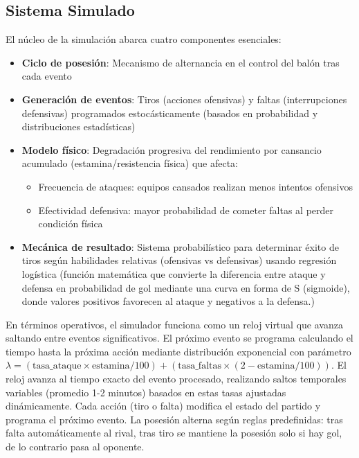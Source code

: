 \documentclass{article}
\begin{document}
\subsection{Sistema Simulado}
El núcleo de la simulación abarca cuatro componentes esenciales:

\begin{itemize}
    \item \textbf{Ciclo de posesión}: Mecanismo de alternancia en el control del balón tras cada evento
    \item \textbf{Generación de eventos}: Tiros (acciones ofensivas) y faltas (interrupciones defensivas) programados estocásticamente (basados en probabilidad y distribuciones estadísticas)
    \item \textbf{Modelo físico}: Degradación progresiva del rendimiento por cansancio acumulado (estamina/resistencia física) que afecta:
    \begin{itemize}
        \item Frecuencia de ataques: equipos cansados realizan menos intentos ofensivos
        \item Efectividad defensiva: mayor probabilidad de cometer faltas al perder condición física
    \end{itemize}
    \item \textbf{Mecánica de resultado}: Sistema probabilístico para determinar éxito de tiros según habilidades relativas (ofensivas vs defensivas) usando regresión logística (función matemática que convierte la diferencia entre ataque y defensa en probabilidad de gol mediante una curva en forma de S (sigmoide), donde valores positivos favorecen al ataque y negativos a la defensa.)
\end{itemize}

En términos operativos, el simulador funciona como un reloj virtual que avanza saltando entre eventos significativos. El próximo evento se programa calculando el tiempo hasta la próxima acción mediante distribución exponencial con parámetro $\lambda = (\text{tasa\_ataque} \times \text{estamina}/100) + (\text{tasa\_faltas} \times (2 - \text{estamina}/100))$. El reloj avanza al tiempo exacto del evento procesado, realizando saltos temporales variables (promedio 1-2 minutos) basados en estas tasas ajustadas dinámicamente. Cada acción (tiro o falta) modifica el estado del partido y programa el próximo evento. La posesión alterna según reglas predefinidas: tras falta automáticamente al rival, tras tiro se mantiene la posesión solo si hay gol, de lo contrario pasa al oponente.
\end{document}
